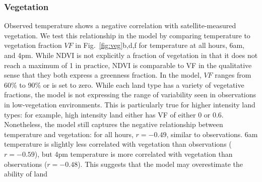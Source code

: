 \documentclass[draft,linenumbers]{agujournal}
\begin{document}
 \subsubsection{Vegetation}
Observed temperature shows a negative correlation with satellite-measured vegetation. We test this relationship in the model by comparing temperature to vegetation fraction $VF$ in Fig.~\ref{fig:veg}b,d,f for temperature at all hours, 6am, and 4pm. While NDVI is not explicitly a fraction of vegetation in that it does not reach a maximum of 1 in practice, NDVI is comparable to VF in the qualitative sense that they both express a greenness fraction. In the model, $VF$ ranges from 60\% to 90\% or is set to zero. While each land type has a variety of vegetative fractions, the model is not expressing the range of variability seen in observations in low-vegetation environments. This is particularly true for higher intensity land types: for example, high intensity land either has VF of either 0 or 0.6. Nonetheless, the model still captures the negative relationship between temperature and vegetation: for all hours, $r= -0.49$, similar to observations. 6am temperature is slightly less correlated with vegetation than observations ($r= -0.59$), but 4pm temperature is more correlated with vegetation than observations ($r= -0.48$). This suggests that the model may overestimate the ability of land

\end{document}

